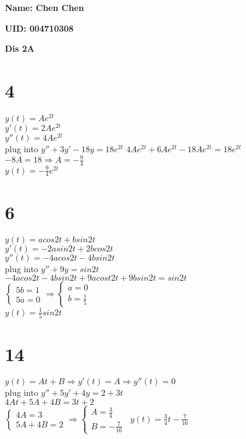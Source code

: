 \documentclass[12pt, a4paper]{IEEEtran}
\begin{document}
    \centerline{\textbf{Name: Chen Chen}}
    \centerline{\textbf{UID: 004710308}}
    \centerline{\textbf{Dis 2A}}
    \begin{flushleft}
    \section*{4}
        $y(t)=Ae^{2t}$\\
        $y'(t)=2Ae^{2t}$\\
        $y''(t)=4Ae^{2t}$\\
        plug into $y''+3y'-18y=18e^{2t}$
        $4Ae^{2t}+6Ae^{2t}-18Ae^{2t}=18e^{2t}$\\
        $-8A=18\Rightarrow A=-\frac{9}{4}$\\
        $y(t)=-\frac{9}{4}e^{2t}$


    \section*{6}
    $y(t)=acos2t+bsin2t$\\
    $y'(t)=-2asin2t+2bcos2t$\\
    $y''(t)=-4acos2t-4bsin2t$\\
    plug into $y''+9y=sin2t$\\
    $-4acos2t-4bsin2t+9acost2t+9bsin2t=sin2t$\\
    \vspace{1ex}
    $\begin{cases}
    5b=1\\
    5a=0
    \end{cases}
    \Rightarrow
    \begin{cases}
        a=0\\
        b=\frac{1}{5}
    \end{cases}$\\
    $y(t)=\frac{1}{5}sin2t$


    \section*{14}
    $y(t)=At+B \Rightarrow y'(t)=A \Rightarrow y''(t)=0$\\
    plug into $y''+5y'+4y=2+3t$\\
    $4At+5A+4B=3t+2$\\
    \vspace{1ex}
    $\begin{cases}
        4A=3\\
        5A+4B=2
    \end{cases}
    \Rightarrow
    \begin{cases}
        A=\frac{3}{4}\\
        B=-\frac{7}{16}
    \end{cases}$\
    $y(t)=\frac{3}{4}t-\frac{7}{16}$


\end{flushleft}
\end{document}
